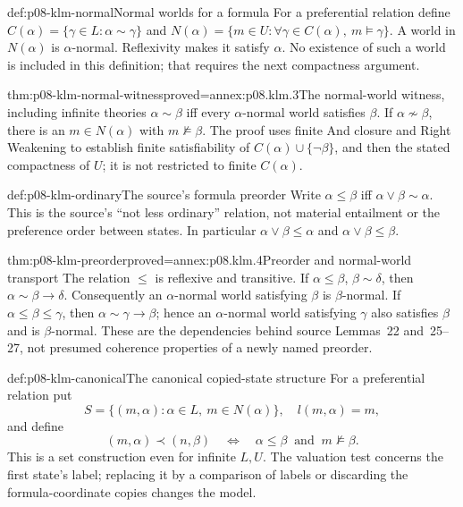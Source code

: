 \begin{hbdefinition}{def:p08-klm-normal}{Normal worlds for a formula}
For a preferential relation define
\(C(\alpha)=\{\gamma\in L:\alpha\sim\gamma\}\) and
\(N(\alpha)=\{m\in U:\forall\gamma\in C(\alpha),\ m\models\gamma\}\).
A world in \(N(\alpha)\) is \(\alpha\)-normal. Reflexivity makes
it satisfy \(\alpha\). No existence of such a world is included in
this definition; that requires the next compactness argument.
\end{hbdefinition}

\begin{hblemma}{thm:p08-klm-normal-witness}{proved=annex:p08.klm.3}{The normal-world witness, including infinite theories}
\(\alpha\sim\beta\) iff every \(\alpha\)-normal world satisfies
\(\beta\). If \(\alpha\not\sim\beta\), there is an
\(m\in N(\alpha)\) with \(m\not\models\beta\).
The proof uses finite And closure and Right Weakening to establish
finite satisfiability of \(C(\alpha)\cup\{\neg\beta\}\), and then
the stated compactness of \(U\); it is not restricted to finite \(C(\alpha)\).
\end{hblemma}

\begin{hbdefinition}{def:p08-klm-ordinary}{The source's formula preorder}
Write \(\alpha\leq\beta\) iff \(\alpha\vee\beta\sim\alpha\).
This is the source's ``not less ordinary'' relation, not material
entailment or the preference order between states. In particular
\(\alpha\vee\beta\leq\alpha\) and
\(\alpha\vee\beta\leq\beta\).
\end{hbdefinition}

\begin{hblemma}{thm:p08-klm-preorder}{proved=annex:p08.klm.4}{Preorder and normal-world transport}
The relation \(\leq\) is reflexive and transitive.
If \(\alpha\leq\beta\), \(\beta\sim\delta\), then
\(\alpha\sim\beta\to\delta\). Consequently an
\(\alpha\)-normal world satisfying \(\beta\) is \(\beta\)-normal.
If \(\alpha\leq\beta\leq\gamma\), then
\(\alpha\sim\gamma\to\beta\); hence an \(\alpha\)-normal world
satisfying \(\gamma\) also satisfies \(\beta\) and is \(\beta\)-normal.
These are the dependencies behind source Lemmas~22 and~25--27,
not presumed coherence properties of a newly named preorder.
\end{hblemma}

\begin{hbdefinition}{def:p08-klm-canonical}{The canonical copied-state structure}
For a preferential relation put
\[
 S=\{(m,\alpha):\alpha\in L,\ m\in N(\alpha)\},\quad
 l(m,\alpha)=m,
\]
and define
\[
 (m,\alpha)\prec(n,\beta)
 \quad\Longleftrightarrow\quad
 \alpha\leq\beta\ \text{ and }\ m\not\models\beta.
\]
This is a set construction even for infinite \(L,U\). The valuation
test concerns the first state's label; replacing it by a comparison
of labels or discarding the formula-coordinate copies changes the model.
\end{hbdefinition}

